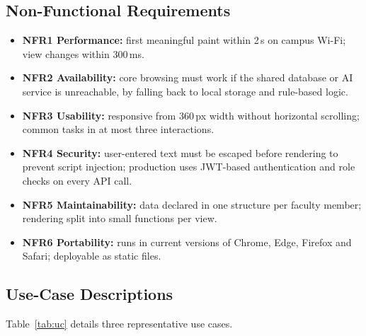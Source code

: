 \documentclass[conference]{IEEEtran}
\begin{document}
\subsection{Non-Functional Requirements}
\begin{itemize}
  \item \textbf{NFR1 Performance:} first meaningful paint within 2\,s on campus Wi-Fi; view changes within 300\,ms.
  \item \textbf{NFR2 Availability:} core browsing must work if the shared database or AI service is unreachable, by falling back to local storage and rule-based logic.
  \item \textbf{NFR3 Usability:} responsive from 360\,px width without horizontal scrolling; common tasks in at most three interactions.
  \item \textbf{NFR4 Security:} user-entered text must be escaped before rendering to prevent script injection; production uses JWT-based authentication and role checks on every API call.
  \item \textbf{NFR5 Maintainability:} data declared in one structure per faculty member; rendering split into small functions per view.
  \item \textbf{NFR6 Portability:} runs in current versions of Chrome, Edge, Firefox and Safari; deployable as static files.
\end{itemize}

\subsection{Use-Case Descriptions}
Table~\ref{tab:uc} details three representative use cases.
\end{document}
